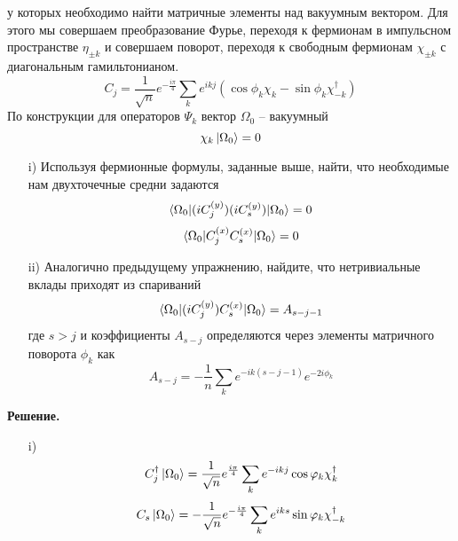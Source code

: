 \documentclass[12pt]{article}
\theoremstyle{definition}
\begin{document}
\begin{enumerate}
\begin{equation}
    \end{equation}
    у которых необходимо найти матричные элементы над вакуумным вектором. Для этого мы совершаем преобразование Фурье, переходя к фермионам в импульсном пространстве $\eta_{\pm k}$ и совершаем поворот, переходя к свободным фермионам $\chi_{\pm k}$ с диагональным гамильтонианом.
    \begin{equation}
        C_j=\frac{1}{\sqrt{n}}e^{-\frac{i\pi}{4}}\sum\limits_ke^{ikj}(\cos\phi_k\chi_k-\sin\phi_k\chi^\dagger_{-k})
    \end{equation}
    По конструкции для операторов $\Psi_k$ вектор $\Omega_0$ -- вакуумный
    \begin{equation}
        \chi_k\ket{\Omega_0}=0
    \end{equation}
    \begin{itemize}
        \item[i)] Используя фермионные формулы, заданные выше, найти, что необходимые нам двухточечные средни задаются
        \begin{equation}
            \braket{\Omega_0|(iC_j^{(y)})(iC_s^{(y)})|\Omega_0}=0
        \end{equation}
        \begin{equation}
            \braket{\Omega_0|C^{(x)}_jC^{(x)}_s|\Omega_0}=0
        \end{equation}
        \item[ii)] Аналогично предыдущему упражнению, найдите, что нетривиальные вклады приходят из спариваний
        \begin{equation}
            \braket{\Omega_0|(iC^{(y)}_j)C_s^{(x)}|\Omega_0}=A_{s-j-1}
        \end{equation}
        где $s>j$ и коэффициенты $A_{s-j}$ определяются через элементы матричного поворота $\phi_k$ как
        \begin{equation}
            A_{s-j}=-\frac{1}{n}\sum\limits_ke^{-ik(s-j-1)}e^{-2i\phi_k}
        \end{equation}
    \end{itemize}
    \textbf{Решение.}
    \begin{itemize}
        \item[i)] 
        \begin{equation}
            C_j^\dagger\ket{\Omega_0}=\frac{1}{\sqrt{n}}e^{\frac{i\pi}{4}}\sum\limits_ke^{-ikj}\cos\varphi_k\chi^\dagger_k
        \end{equation}
        \begin{equation}
            C_s\ket{\Omega_0}=-\frac{1}{\sqrt{n}}e^{-\frac{i\pi}{4}}\sum\limits_ke^{iks}\sin\varphi_k\chi^\dagger_{-k}

\end{equation}
\end{itemize}
\end{enumerate}
\end{document}
